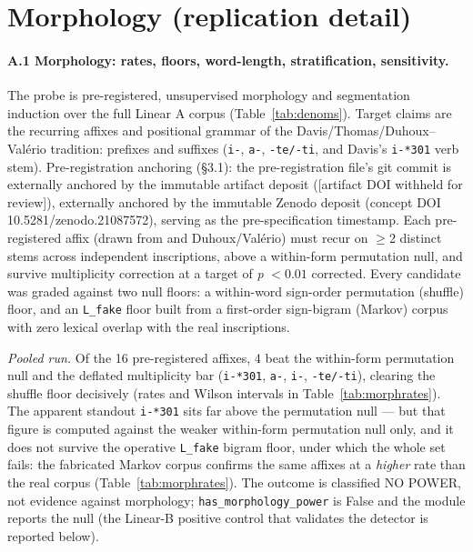 
\nocite{*}


\appendix

\section{Morphology (replication detail)}

\paragraph{A.1 Morphology: rates, floors, word-length, stratification,
sensitivity.} The probe is pre-registered, unsupervised morphology and
segmentation induction over the full Linear A corpus
(Table~\ref{tab:denoms}). Target claims are the recurring affixes and
positional grammar of the Davis/Thomas/Duhoux--Val\'{e}rio tradition:
prefixes and suffixes (\texttt{i-}, \texttt{a-}, \texttt{-te/-ti}, and
Davis's \texttt{i-*301} verb stem). Pre-registration anchoring (\S3.1):
the pre-registration file's git commit is
\ifanon
externally anchored by the immutable artifact deposit ([artifact DOI
withheld for review]),
\else
externally anchored by the immutable Zenodo deposit (concept DOI
10.5281/zenodo.21087572),
\fi
serving as the pre-specification timestamp. Each pre-registered affix
(drawn from \citet{thomas2020} and Duhoux/Val\'{e}rio) must recur on
$\ge$2 distinct stems across independent inscriptions, above a
within-form permutation null, and survive multiplicity correction at a
target of \emph{p} $< 0.01$ corrected. Every candidate was graded against two
null floors: a within-word sign-order permutation (shuffle) floor, and an
\texttt{L\_fake} floor built from a first-order sign-bigram (Markov) corpus
with zero lexical overlap with the real inscriptions.

\emph{Pooled run.} Of the 16 pre-registered affixes, 4 beat the within-form
permutation null and the deflated multiplicity bar (\texttt{i-*301},
\texttt{a-}, \texttt{i-}, \texttt{-te/-ti}), clearing the shuffle floor
decisively (rates and Wilson intervals in Table~\ref{tab:morphrates}).
The apparent standout \texttt{i-*301} sits far above the permutation null
--- but that figure is computed against the weaker within-form permutation
null only, and it does not survive the operative \texttt{L\_fake} bigram
floor, under which the whole set fails: the fabricated Markov corpus
confirms the same affixes at a \emph{higher} rate than the real corpus
(Table~\ref{tab:morphrates}). The outcome is classified NO POWER, not
evidence against morphology; \texttt{has\_morphology\_power} is False and
the module reports the null (the Linear-B positive control that validates
the detector is reported below).


